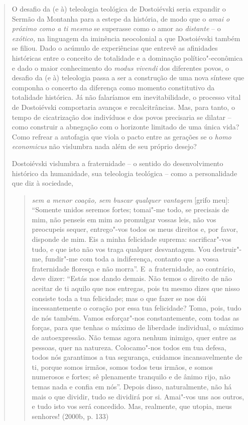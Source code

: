 {\begin{quote}
O desafio da (e à) teleologia teológica de Dostoiévski seria expandir o
Sermão da Montanha para a estepe da história, de modo que o \emph{amai o
próximo como a ti mesmo} se superasse como o amor ao \emph{distante} --
o \emph{exótico,} na linguagem da iminência neocolonial a que
Dostoiévski também se filiou. Dado o acúmulo de experiências que entrevê
as afinidades históricas entre o conceito de totalidade e a dominação
político"-econômica e dado o maior conhecimento do \emph{modus vivendi}
dos diferentes povos, o desafio da (e à) teleologia passa a ser a
construção de uma nova síntese que componha o concerto da diferença como
momento constitutivo da totalidade histórica. Já não falaríamos em
inevitabilidade, o processo vital de Dostoiévski comportaria avanços e
recalcitrâncias. Mas, para tanto, o tempo de cicatrização dos indivíduos
e dos povos precisaria se dilatar -- como construir a abnegação com o
horizonte limitado de uma única vida? Como refrear a autofagia que viola
o pacto entre as gerações se o \emph{homo economicus} não vislumbra nada
além de seu próprio desejo?

Dostoiévski vislumbra a fraternidade -- o sentido do desenvolvimento
histórico da humanidade, sua teleologia teológica -- como a
personalidade que diz à sociedade,

\begin{quote}
\emph{sem a menor coação, sem buscar qualquer vantagem} {[}grifo meu{]}:
``Somente unidos seremos fortes; tomai"-me todo, se precisais de mim, não
penseis em mim ao promulgar vossas leis, não vos preocupeis sequer,
entrego"-vos todos os meus direitos e, por favor, disponde de mim. Eis a
minha felicidade suprema: sacrificar"-vos tudo, e que isto não vos traga
qualquer desvantagem. Vou destruir"-me, fundir"-me com toda a indiferença,
contanto que a vossa fraternidade floresça e não morra''. E~a
fraternidade, ao contrário, deve dizer: ``Estás nos dando demais. Não
temos o direito de não aceitar de ti aquilo que nos entregas, pois tu
mesmo dizes que nisso consiste toda a tua felicidade; mas o que fazer se
nos dói incessantemente o coração por essa tua felicidade? Toma, pois,
tudo de nós também. Vamos esforçar"-nos constantemente, com todas as
forças, para que tenhas o máximo de liberdade individual, o máximo de
autoexpressão. Não temas agora nenhum inimigo, quer entre as pessoas,
quer na natureza. Colocamo"-nos todos em tua defesa, todos nós garantimos
a tua segurança, cuidamos incansavelmente de ti, porque somos irmãos,
somos todos teus irmãos, e somos numerosos e fortes; sê plenamente
tranquilo e de ânimo rijo, não temas nada e confia em nós''. Depois
disso, naturalmente, não há mais o que dividir, tudo se dividirá por si.
Amai"-vos uns aos outros, e tudo isto vos será concedido. Mas, realmente,
que utopia, meus senhores! (2000b, p. 133)
\end{quote}


\end{quote}}
